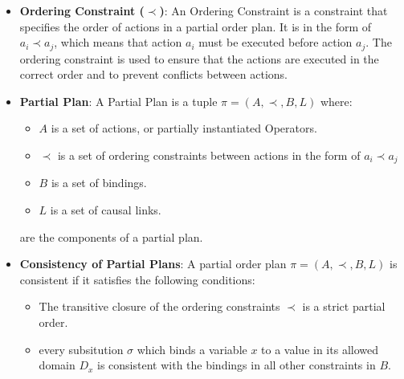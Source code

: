 \begin{itemize}
      \item  \label{def:ordering_constraint}
            \textbf{Ordering Constraint ($\prec$)}: An Ordering Constraint is a constraint that specifies the order of actions in a partial order plan. It is in the form of $a_i \prec a_j$, which means that action $a_i$ must be executed before action $a_j$. The ordering constraint is used to ensure that the actions are executed in the correct order and to prevent conflicts between actions.

      \item  \label{def:partial_plan}
            \textbf{Partial Plan}: A Partial Plan is a tuple $\pi = (A, \prec, B, L)$ where:
            \begin{itemize}
                  \item $A$ is a set of actions, or partially instantiated Operators.
                  \item $\prec$ is a set of ordering constraints between actions in the form of $a_i \prec a_j$
                  \item $B$ is a set of bindings.
                  \item $L$ is a set of causal links.
            \end{itemize}
            are the components of a partial plan.


      \item  \label{def:consistency_partial_plan}
            \textbf{Consistency of Partial Plans}: A partial order plan $\pi = (A, \prec, B, L)$ is consistent if it satisfies the following conditions: \cite{10.5555/975615}
            \begin{itemize}
                  \item The transitive closure of the ordering constraints $\prec$ is a strict partial order.
                  \item every subsitution $\sigma $ which binds a variable $x$ to a value in its allowed domain $D_x$ is consistent with the bindings in all other constraints in $B$.
            \end{itemize}



\end{itemize}
